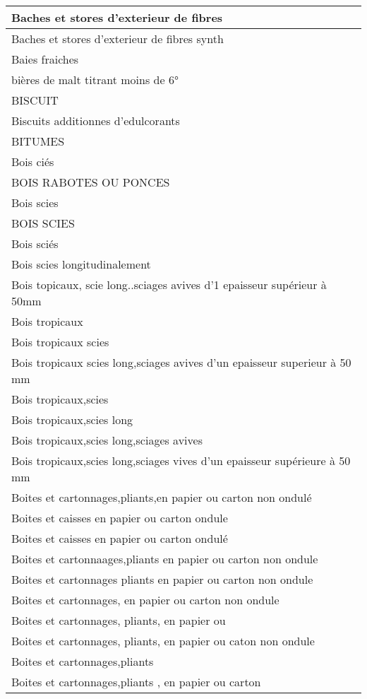 \documentclass[
]{book}
\begin{document}
\begin{table}
\begin{tabular}[t]{l}
\hline
Baches et stores d'exterieur de fibres\\
\hline
Baches et stores d'exterieur de fibres synth\\
\hline
Baies fraiches\\
\hline
bières de malt titrant moins de 6°\\
\hline
BISCUIT\\
\hline
Biscuits additionnes d'edulcorants\\
\hline
BITUMES\\
\hline
Bois ciés\\
\hline
BOIS RABOTES OU PONCES\\
\hline
Bois scies\\
\hline
BOIS SCIES\\
\hline
Bois sciés\\
\hline
Bois scies longitudinalement\\
\hline
Bois topicaux, scie long..sciages avives d'1 epaisseur supérieur à 50mm\\
\hline
Bois tropicaux\\
\hline
Bois tropicaux scies\\
\hline
Bois tropicaux scies long,sciages avives d'un epaisseur superieur à 50 mm\\
\hline
Bois tropicaux,scies\\
\hline
Bois tropicaux,scies long\\
\hline
Bois tropicaux,scies long,sciages avives\\
\hline
Bois tropicaux,scies long,sciages vives d'un epaisseur supérieure à 50 mm\\
\hline
Boites  et cartonnages,pliants,en papier ou carton non ondulé\\
\hline
Boites et caisses en papier ou carton ondule\\
\hline
Boites et caisses en papier ou carton ondulé\\
\hline
Boites et cartonnaages,pliants en papier ou carton non ondule\\
\hline
Boites et cartonnages pliants en papier ou carton non ondule\\
\hline
Boites et cartonnages, en papier ou carton non ondule\\
\hline
Boites et cartonnages, pliants, en papier ou\\
\hline
Boites et cartonnages, pliants, en papier ou caton non ondule\\
\hline
Boites et cartonnages,pliants\\
\hline
Boites et cartonnages,pliants , en papier ou carton\\

\end{tabular}
\end{table}
\end{document}
